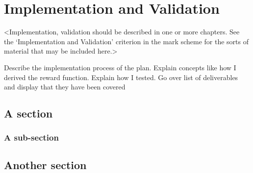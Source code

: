 \chapter{Implementation and Validation}
\label{chapter3}

<Implementation, validation should be described in one or more chapters. See the `Implementation and Validation' criterion in the mark scheme for the sorts of material that may be included here.>

Describe the implementation process of the plan. Explain concepts like how I derived the reward function. Explain how I tested. Go over list of deliverables and display that they have been covered

\section{A section}
\lipsum[8]

\subsection{A sub-section}
\lipsum[11]

\section{Another section}
\lipsum[12]
